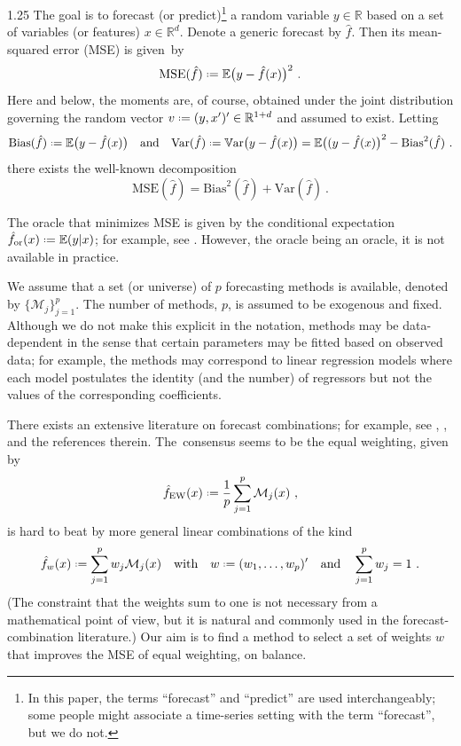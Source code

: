 \documentclass[12pt]{article}
\newcommand*{\defeq}{\mathrel{\vcenter{\baselineskip0.5ex\lineskiplimit0pt\hbox{\scriptsize.}\hbox{\scriptsize.}}}=}
\newcommand{\M}{\mathcal M}
\newcommand{\E}{{\mathbb{E}}}
\newcommand{\V}{{\mathbb{V}\mbox{ar}}}
\newcommand{\R}{{\mathbb{R}}}
\numberwithin{equation}{section}
\theoremstyle{plain}
\begin{document}
\begin{spacing}{1.25}
The goal is to forecast (or predict)\footnote{In this paper, the terms
  ``forecast'' and ``predict'' are used interchangeably; 
  some people might associate a time-series setting 
  with the term ``forecast'', but we do not.}
a random variable $y \in \R$ based on a set of variables
(or features) $x \in \R^d$. Denote a generic forecast by $\hat
f$. Then its mean-squared error (MSE) is given~by
$$
\mbox{MSE}(\hat f) \defeq  \E \bigl (y - \hat f(x) \bigr)^2~.
$$
Here and below, the moments are, of course, obtained under the joint
distribution governing the random vector $v \defeq (y, x')' \in
\R^{1+d}$ and assumed to exist.
Letting
$$
\mbox{Bias} (\hat f) \defeq \E \bigl (y - \hat f(x) \bigr )
\quad \mbox{and} \quad
\mbox{Var} (\hat f) \defeq \V \bigl (y - \hat f(x) \bigr )
= \E \bigl ( (y - \hat f(x) \bigr )^2 -
\mbox{Bias}^2 (\hat f)~.
$$
there exists the well-known decomposition
\begin{equation} 
\mbox{MSE}(\hat f) = \mbox{Bias}^2(\hat f) + \mbox{Var}(\hat f)~.
\end{equation}

The oracle that minimizes MSE is given by the
conditional expectation
\mbox{$\hat f_{\text{or}}(x) \defeq \E(y|x)$}; for example,
see \citet[Section 2.9]{hayashi:2000}. However, the oracle being an
oracle, it is not available in practice.

We assume that a set (or universe) of $p$ forecasting methods is
available, denoted by $\{\M_j\}_{j=1}^p$. The number of methods,
$p$, is assumed to be exogenous and fixed. Although we do not make
this explicit in the notation, methods may be data-dependent in the
sense that certain parameters may be fitted based on
observed data; for example, the methods may correspond to linear
regression models where each model postulates the identity (and the number)
of regressors but not the values of the corresponding coefficients.


There exists an extensive literature on forecast combinations; for
example, see \citet[Chapter 14]{elliott:timmermann:2016},
\cite{wang:hyndman:li:Kang:2022}, and the references therein. 
The~consensus seems to be the equal weighting, given by
$$
\hat f_{\text{EW}}(x) \defeq \frac{1}{p} \sum_{j=1}^p \M_j(x)~,
$$
is hard to beat by more general linear combinations of the kind
\begin{equation} \label{eq:rf-w}
\hat f_w(x) \defeq \sum_{j=1}^p w_j \M_j(x) \quad \mbox{with}
\quad w \defeq (w_1, \ldots, w_p)' \quad \mbox{and}
\quad \sum_{j=1}^p w_j= 1~.
\end{equation} 
(The constraint that the weights sum to one is not necessary from a mathematical point of view, but it is natural and commonly used in the forecast-combination literature.)
Our aim is to find a method to select a set of
weights $w$ that improves the 
MSE of equal weighting, on balance.


\end{spacing}
\end{document}
